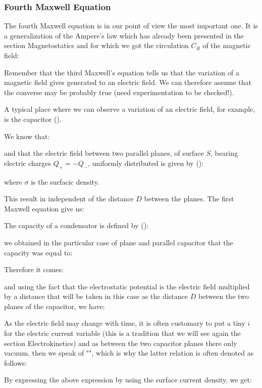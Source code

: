 	\subsubsection{Fourth Maxwell Equation}\label{fourth maxwell equation}
	The fourth Maxwell equation is in our point of view the most important one. It is a generalization of the Ampere's law which has already been presented in the section Magnetostatics and for which we got the circulation $C_B$ of the magnetic field:
	
	Remember that the third Maxwell's equation tells us that the variation of a magnetic field gives generated to an electric field. We can therefore assume that the converse may be probably true (need experimentation to be checked!).
	
	A typical place where we can observe a variation of an electric field, for example, is the capacitor ().
	
	We know that:
	
	and that the electric field between two parallel planes, of surface $S$, bearing electric charges $Q_+=-Q_-$, uniformly distributed is given by ():
	
	where $\sigma$ is the surfacic density.

	This result in independent of the distance $D$ between the planes. The first Maxwell equation give us:
	
	The capacity of a condensator is defined by ():
	
	we obtained in the particular case of plane and parallel capacitor that the capacity was equal to:
	
	Therefore it comes:
	
	and using the fact that the electrostatic potential is the electric field multiplied by a distance that will be taken in this case as the distance $D$ between the two planes of the capacitor, we have:
	
	As the electric field may change with time, it is often customary to put a tiny $i$ for the electric current variable (this is a tradition that we will see again the section Electrokinetics) and as between the two capacitor planes there only vacuum, then we speak of "", which is why the latter relation is often denoted as follows:
	
	By expressing the above expression by using the surface current density, we get:
	
